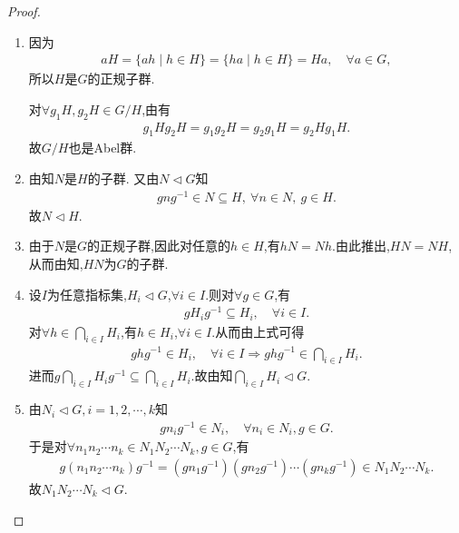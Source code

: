 \documentclass[../../main.tex]{subfiles}%
\begin{document}
\begin{proof}
\begin{enumerate}[(1)]
\item 因为
\begin{align*}
aH = \{ah \mid h \in H\} = \{ha \mid h \in H\} = Ha, \quad \forall a \in G,
\end{align*}
所以$H$是$G$的正规子群.

对$\forall g_1H,g_2H\in G/H$,由有
\begin{align*}
g_1Hg_2H=g_1g_2H=g_2g_1H=g_2Hg_1H.
\end{align*}
故$G/H$也是Abel群.

\item 由知$N$是$H$的子群.
又由$N \lhd G$知
\begin{align*}
gng^{-1} \in N\subseteq H,\ \forall n \in N,\ g \in H.
\end{align*}
故$N\lhd H.$

\item 由于$N$是$G$的正规子群,因此对任意的$h\in H$,有$hN=Nh$.由此推出,$HN=NH$,从而由知,$HN$为$G$的子群.

\item 设$I$为任意指标集,$H_i\lhd G$,$\forall i\in I$.则对$\forall g\in G$,有
\begin{align*}
gH_ig^{-1}\subseteq H_i,\quad \forall i\in I.
\end{align*}
对$\forall h\in \bigcap\limits_{i\in I}{H_i}$,有$h\in H_i$,$\forall i\in I$.从而由上式可得
\begin{align*}
ghg^{-1}\in H_i,\quad \forall i\in I\Longrightarrow ghg^{-1}\in \bigcap\limits_{i\in I}{H_i}.
\end{align*}
进而$g\bigcap\limits_{i\in I}{H_i}g^{-1}\subseteq \bigcap\limits_{i\in I}{H_i}$.故由知$\bigcap\limits_{i\in I}{H_i}\lhd G$.

\item 由$N_i\lhd G,i=1,2,\cdots,k$知
\begin{align*}
gn_ig^{-1}\in N_i,\quad \forall n_i\in N_i,g\in G.
\end{align*}
于是对$\forall n_1n_2\cdots n_k\in N_1N_2\cdots N_k,g\in G$,有
\begin{align*}
g\left(n_1n_2\cdots n_k\right)g^{-1}=\left(gn_1g^{-1}\right)\left(gn_2g^{-1}\right)\cdots\left(gn_kg^{-1}\right)\in N_1N_2\cdots N_k.
\end{align*}
故$N_1N_2\cdots N_k\lhd G.$


\end{enumerate}
\end{proof}
\end{document}

